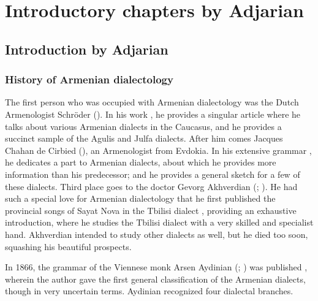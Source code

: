 \part{Introductory chapters by Adjarian}







\chapter{Introduction by Adjarian}

\section{History of Armenian dialectology}
\begin{adjarianpage}\label{page:1}\end{adjarianpage}%

The first person who was occupied with Armenian dialectology was the Dutch Armenologist Schröder (). In his work \citep{Shroder-1711-TheasauresArmenian}, he provides a singular article where he talks about various Armenian dialects in the Caucasus, and he provides a succinct sample of the Agulis and Julfa dialects. After him comes Jacques Chahan de Cirbied (), an Armenologist from Evdokia. In his extensive grammar \citep{Cirbied-1823-GrammarArmenian}, he dedicates a part to Armenian dialects, about which he provides more information than his predecessor; and he provides a general sketch for a few of these dialects. Third place goes to the doctor Gevorg Akhverdian (; ). He had such a special love for Armenian dialectology that he first published the provincial songs of Sayat Nova in the Tbilisi dialect \citep{SayatNova}, providing an exhaustive introduction, where he studies the Tbilisi dialect with a very skilled and specialist hand. Akhverdian intended to study other dialects as well, but he died too soon, squashing his beautiful prospects. 

In 1866, the grammar of the Viennese monk Arsen Aydinian (; ) was published \citep{Aydnian-1867-GrammarArmenian}, wherein the author gave the first general classification of the Armenian dialects, though in very uncertain terms. Aydinian recognized four dialectal branches. 




